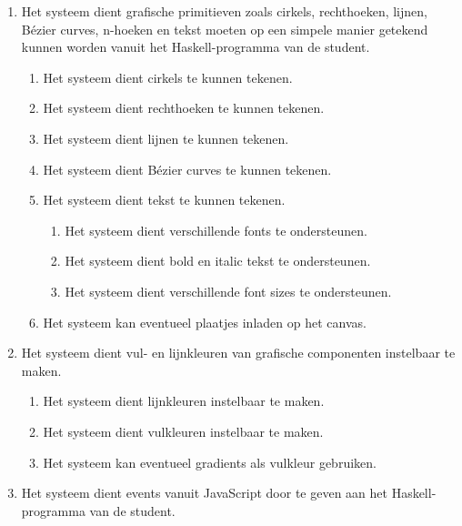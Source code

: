 \begin{enumerate}[label={R\arabic*}]
	\item \label{req:prim} Het systeem dient grafische primitieven zoals cirkels, rechthoeken, lijnen, Bézier curves, n-hoeken en tekst moeten op een simpele manier getekend kunnen worden vanuit het Haskell-programma van de student.
	\begin{enumerate}[label={R\arabic{enumi}.\arabic*}]
		\item \label{req:circle} Het systeem dient cirkels te kunnen tekenen.
		\item \label{req:rect} Het systeem dient rechthoeken te kunnen tekenen.
		\item \label{req:lines} Het systeem dient lijnen te kunnen tekenen.
		\item \label{req:bezier} Het systeem dient Bézier curves te kunnen tekenen.
		\item \label{req:text} Het systeem dient tekst te kunnen tekenen.
		\begin{enumerate}[label={R\arabic{enumi}.\arabic{enumii}.\arabic*}]
			\item Het systeem dient verschillende fonts te ondersteunen.
			\item Het systeem dient bold en italic tekst te ondersteunen.
			\item Het systeem dient verschillende font sizes te ondersteunen.
		\end{enumerate}
		\item \label{req:pictures} Het systeem kan eventueel plaatjes inladen op het canvas.
	\end{enumerate}
	\item Het systeem dient vul- en lijnkleuren van grafische componenten instelbaar te maken.
	\begin{enumerate}[label={R\arabic{enumi}.\arabic*}]
		\item \label{req:colors:lines} Het systeem dient lijnkleuren instelbaar te maken.
		\item \label{req:colors:fill} Het systeem dient vulkleuren instelbaar te maken.
		\item \label{req:colors:fill:gradient} Het systeem kan eventueel gradients als vulkleur gebruiken.
	\end{enumerate}
	\item Het systeem dient events vanuit JavaScript door te geven aan het Haskell-programma van de student.
	\begin{enumerate}[label={R\arabic{enumi}.\arabic*}]

\end{enumerate}
\end{enumerate}
